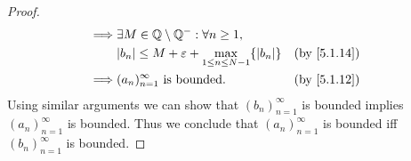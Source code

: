\begin{proof}
\begin{align*}
    \implies & \exists M \in \Q \setminus \Q^- : \forall n \geq 1,                                                                             \\
             & \abs{b_n} \leq M + \varepsilon + \max_{1 \leq n \leq N - 1}\set{\abs{b_n}}                  &  & \by{5.1.14}                    \\
    \implies & (a_n)_{n = 1}^\infty \text{ is bounded}.                                                    &  & \by{5.1.12}
  \end{align*}
  Using similar arguments we can show that \((b_n)_{n = 1}^\infty\) is bounded implies \((a_n)_{n = 1}^\infty\) is bounded.
  Thus we conclude that \((a_n)_{n = 1}^\infty\) is bounded iff \((b_n)_{n = 1}^\infty\) is bounded.
\end{proof}